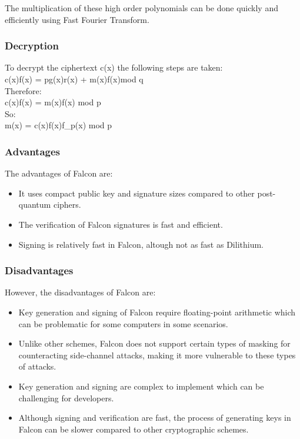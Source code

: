 \documentclass{article}
\begin{document}
The multiplication of these high order polynomials can be done quickly and efficiently using Fast Fourier Transform.

\subsubsection{Decryption}
To decrypt the ciphertext c(x) the following steps are taken:\\
c(x)\cdot f(x) = p\cdot g(x)\cdot r(x) + m(x)\cdot f(x)\quad mod q\\
Therefore:\\
c(x)\cdot f(x) = m(x)\cdot f(x) mod p\\
So:\\
m(x) = c(x)\cdot f(x)\cdot f_p(x) mod p

\subsubsection{Advantages}
The advantages of Falcon are:\\
\begin{itemize}
    \item It uses compact public key and signature sizes compared to other post-quantum ciphers.
    \item The verification of Falcon signatures is fast and efficient.
    \item Signing is relatively fast in Falcon, altough not as fast as Dilithium.
\end{itemize}

 \subsubsection{Disadvantages}
However, the disadvantages of Falcon are:
\begin{itemize}
    \item Key generation and signing of Falcon require floating-point arithmetic which can be problematic for some computers in some scenarios.
    \item Unlike other schemes, Falcon does not support certain types of masking for counteracting side-channel attacks, making it more vulnerable to these types of attacks.
    \item Key generation and signing are complex to implement which can be challenging for developers.
    \item Although signing and verification are fast, the process of generating keys in Falcon can be slower compared to other cryptographic schemes.
\end{itemize}
\end{document}
